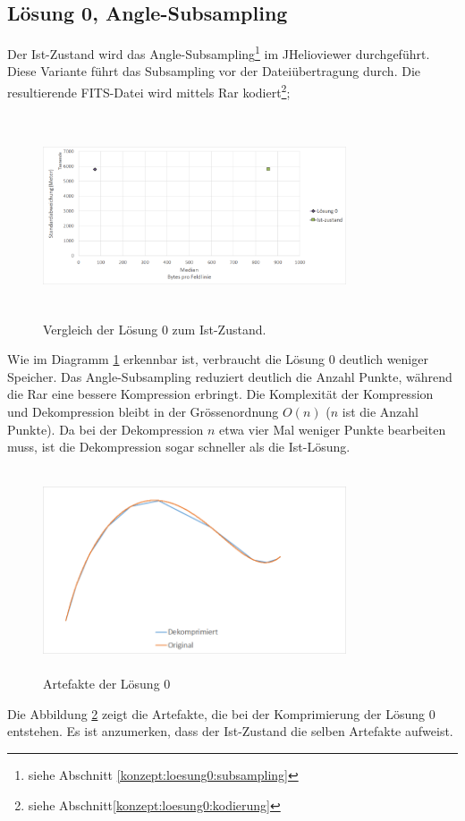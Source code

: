 \subsection{Lösung 0, Angle-Subsampling} \label{resultate:loesung0}
Der Ist-Zustand wird das Angle-Subsampling\footnote{siehe Abschnitt \ref{konzept:loesung0:subsampling}} im JHelioviewer durchgeführt. Diese Variante führt das Subsampling vor der Dateiübertragung durch. Die resultierende FITS-Datei wird mittels Rar kodiert\footnote{siehe Abschnitt\ref{konzept:loesung0:kodierung}};
\begin{figure}[!htbp]
	\center
	\includegraphics[width=0.8\textwidth,height=6cm,keepaspectratio]{./pictures/resultate/loesung0/loesung0_0.png}
	\caption{Vergleich der Lösung 0 zum Ist-Zustand.}
	\label{resultate:loesung0:loesung0_0}
\end{figure}
Wie im Diagramm \ref{resultate:loesung0:loesung0_0} erkennbar ist, verbraucht die Lösung 0 deutlich weniger Speicher. Das Angle-Subsampling reduziert deutlich die Anzahl Punkte, während die Rar eine bessere Kompression erbringt. Die Komplexität der Kompression und Dekompression bleibt in der Grössenordnung $O(n)$ ($n$ ist die Anzahl Punkte). Da bei der Dekompression $n$ etwa vier Mal weniger Punkte bearbeiten muss, ist die Dekompression sogar schneller als die Ist-Lösung.\\
\begin{figure}[!htbp]
	\center
	\includegraphics[width=0.8\textwidth,height=6cm,keepaspectratio]{./pictures/resultate/loesung0/loesung0_artefakte.png}
	\caption{Artefakte der Lösung 0}
	\label{resultate:loesung0:artefakte}
\end{figure}
Die Abbildung \ref{resultate:loesung0:artefakte} zeigt die Artefakte, die bei der Komprimierung der Lösung 0 entstehen. Es ist anzumerken, dass der Ist-Zustand die selben Artefakte aufweist.

